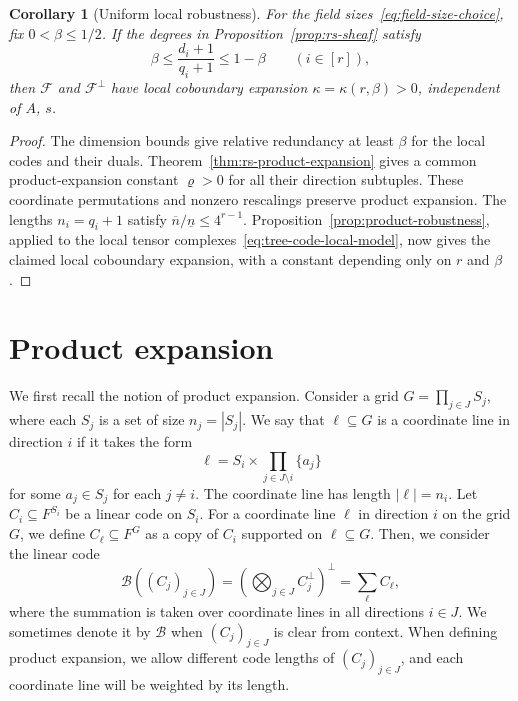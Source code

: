 \documentclass[11pt,letterpaper]{article}
\renewcommand{\le}{\leqslant}
\newtheorem{corollary}[theorem]{Corollary}
\theoremstyle{definition}
\theoremstyle{remark}
\newcommand{\cF}{\mathcal F}
\begin{document}
\begin{corollary}[Uniform local robustness]
\label{prop:local-expansion}\label{arb:product-expansion}
For the field sizes~\eqref{eq:field-size-choice}, fix $0<\beta\le1/2$.
If the degrees in
Proposition~\ref{prop:rs-sheaf} satisfy
\[
 \beta\le\frac{d_i+1}{q_i+1}\le1-\beta\qquad(i\in[r]),
\]
then $\cF$ and $\cF^\perp$ have local coboundary expansion
$\kappa=\kappa(r,\beta)>0$, independent of $A$, $s$.
\end{corollary}
\begin{proof}
The dimension bounds give relative redundancy at least $\beta$
for the local codes and their duals.
Theorem~\ref{thm:rs-product-expansion} gives a common product-expansion
constant $\varrho>0$ for all their direction subtuples.
These coordinate permutations and nonzero rescalings preserve
product expansion.
The lengths $n_i=q_i+1$ satisfy $\overline n/\underline n\le4^{r-1}$.
Proposition~\ref{prop:product-robustness}, applied to the local tensor
complexes~\eqref{eq:tree-code-local-model}, now gives the claimed local
coboundary expansion, with a constant depending only on $r$ and $\beta$.
\end{proof}
\fi

\section{Product expansion}
\label{sec:product-expansion}

We first recall the notion of product expansion. Consider a grid $G = \prod_{j \in J} S_j$, where each $S_j$ is a set of size $n_j = |S_j|$. We say that $\ell \subseteq G$ is a coordinate line in direction $i$ if it takes the form \[\ell = S_i \times \prod_{j \in J \setminus i} \{a_j\}\]
for some $a_j \in S_j$ for each $j\neq i$. The coordinate line has length $|\ell| = n_i$. Let $C_i\subseteq F^{S_i}$ be a linear code on $S_i$. For a coordinate line $\ell$ in direction $i$ on the grid $G$, we define $C_\ell \subseteq F^{G}$ as a copy of $C_i$ supported on $\ell \subseteq G$.
Then, we consider the linear code \[\mathcal{B}((C_j)_{j \in J}) = \left(\bigotimes_{j\in J} C_j^\perp \right)^\perp = \sum_\ell C_\ell,\]
where the summation is taken over coordinate lines in all directions $i \in J$. We sometimes denote it by $\mathcal{B}$ when $(C_j)_{j \in J}$ is clear from context. 
When defining product expansion, we allow different code lengths of $(C_j)_{j\in J}$, and each coordinate line will be weighted by its length.
\end{document}
